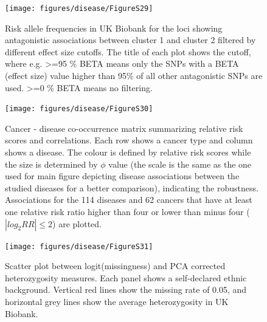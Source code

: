 \documentclass[12pt,twoside]{unicam}
\begin{document}
\begin{figure}

{\centering \texttt{[image: figures/disease/FigureS29]} 

}

\caption[Risk allele frequencies in UK Biobank for the loci showing antagonistic associations between cluster 1 and cluster 2 filtered by different effect size cutoffs.]{Risk allele frequencies in UK Biobank for the loci showing antagonistic associations between cluster 1 and cluster 2 filtered by different effect size cutoffs. The title of each plot shows the cutoff, where e.g. >=95 \% BETA means only the SNPs with a BETA (effect size) value higher than 95\% of all other antagonistic SNPs are used. >=0 \% BETA means no filtering.}\label{fig:disFigS29}
\end{figure}

\begin{figure}

{\centering \texttt{[image: figures/disease/FigureS30]} 

}

\caption[Cancer - disease co-occurrence matrix summarizing relative risk scores and correlations.]{Cancer - disease co-occurrence matrix summarizing relative risk scores and correlations. Each row shows a cancer type and column shows a disease. The colour is defined by relative risk scores while the size is determined by $\phi$ value (the scale is the same as the one used for main figure depicting disease associations between the studied diseases for a better comparison), indicating the robustness. Associations for the 114 diseases and 62 cancers that have at least one relative risk ratio higher than four or lower than minus four ($|log_2RR| ≤ 2$) are plotted.}\label{fig:disFigS30}
\end{figure}

\begin{figure}

{\centering \texttt{[image: figures/disease/FigureS31]} 

}

\caption[Scatter plot between logit(missingness) and PCA corrected heterozygosity measures.]{Scatter plot between logit(missingness) and PCA corrected heterozygosity measures. Each panel shows a self-declared ethnic background. Vertical red lines show the missing rate of 0.05, and horizontal grey lines show the average heterozygosity in UK Biobank.}\label{fig:disFigS31}
\end{figure}
\end{document}

